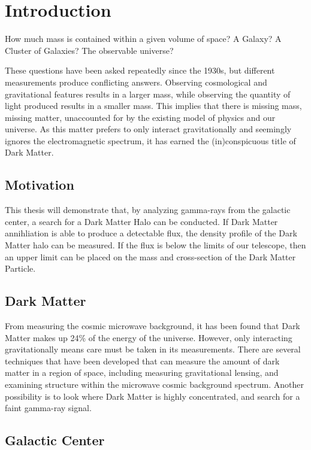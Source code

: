 \cleartooddpage[\thispagestyle{empty}]
\chapter{Introduction}

How much mass is contained within a given volume of space?
A Galaxy?
A Cluster of Galaxies?
The observable universe?

These questions have been asked repeatedly since the 1930s, but different measurements produce conflicting answers.
Observing cosmological and gravitational features results in a larger mass, while observing the quantity of light produced results in a smaller mass.
This implies that there is missing mass, missing matter, unaccounted for by the existing model of physics and our universe.
As this matter prefers to only interact gravitationally and seemingly ignores the electromagnetic spectrum, it has earned the (in)conspicuous title of Dark Matter.

\section{Motivation}
This thesis will demonstrate that, by analyzing gamma-rays from the galactic center, a search for a Dark Matter Halo can be conducted.
If Dark Matter annihliation is able to produce a detectable flux, the density profile of the Dark Matter halo can be measured.
If the flux is below the limits of our telescope, then an upper limit can be placed on the mass and cross-section of the Dark Matter Particle.

\section{Dark Matter}

From measuring the cosmic microwave background, it has been found that Dark Matter makes up 24\% of the energy of the universe\cite{pdg_2012}.
However, only interacting gravitationally means care must be taken in its measurements.
There are several techniques that have been developed that can measure the amount of dark matter in a region of space, including measuring gravitational lensing, and examining structure within the microwave cosmic background spectrum.
Another possibility is to look where Dark Matter is highly concentrated, and search for a faint gamma-ray signal.


\section{Galactic Center}

